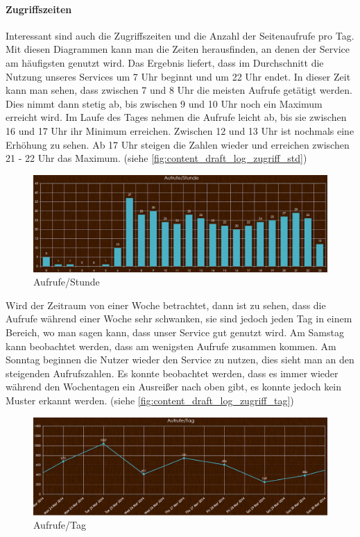 \paragraph{Zugriffszeiten\\}
Interessant sind auch die Zugriffszeiten und die Anzahl der Seitenaufrufe pro Tag.\\
Mit diesen Diagrammen kann man die Zeiten herausfinden, an denen der Service am häufigsten genutzt wird. Das Ergebnis liefert, dass im Durchschnitt die Nutzung unseres Services um 7 Uhr beginnt und um 22 Uhr endet. In dieser Zeit kann man sehen, dass zwischen 7 und 8 Uhr die meisten Aufrufe getätigt werden. Dies nimmt dann stetig ab, bis zwischen 9 und 10 Uhr noch ein Maximum erreicht wird. Im Laufe des Tages nehmen die Aufrufe leicht ab, bis sie zwischen 16 und 17 Uhr ihr Minimum erreichen. Zwischen 12 und 13 Uhr ist nochmals eine Erhöhung zu sehen. Ab 17 Uhr steigen die Zahlen wieder und erreichen zwischen 21 - 22 Uhr das Maximum. (siehe \autoref{fig:content_draft_log_zugriff_std})

\begin{figure}[H]
\centering
\includegraphics[keepaspectratio=true, width=17cm]{images/screenshots/statistics/aufruf_std.png}
\caption{Aufrufe/Stunde}
\label{fig:content_draft_log_zugriff_std}
\end{figure}

Wird der Zeitraum von einer Woche betrachtet, dann ist zu sehen, dass die Aufrufe während einer Woche sehr schwanken, sie sind jedoch jeden Tag in einem Bereich, wo man sagen kann, dass unser Service gut genutzt wird. Am Samstag kann beobachtet werden, dass am wenigsten Aufrufe zusammen kommen. Am Sonntag beginnen die Nutzer wieder den Service zu nutzen, dies sieht man an den steigenden Aufrufszahlen. Es konnte beobachtet werden, dass es immer wieder während den Wochentagen ein Ausreißer nach oben gibt, es konnte jedoch kein Muster erkannt werden. (siehe \autoref{fig:content_draft_log_zugriff_tag})


\begin{figure}[H]
\centering
\includegraphics[keepaspectratio=true, width=17cm]{images/screenshots/statistics/aufruf_tag.png}
\caption{Aufrufe/Tag}
\label{fig:content_draft_log_zugriff_tag}
\end{figure}

